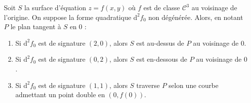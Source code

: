 
  \begin{application}
    Soit $S$ la surface d'équation $z = f(x, y)$ où $f$ est de classe $\mathcal{C}^3$ au voisinage de l'origine. On suppose la forme quadratique $\mathrm{d}^2 f_0$ non dégénérée. Alors, en notant $P$ le plan tangent à $S$ en $0$ :
    \begin{enumerate}[label={\bfseries(\roman*)}]
      \item Si $\mathrm{d}^2 f_0$ est de signature $(2, 0)$, alors $S$ est au-dessus de $P$ au voisinage de $0$.
      \item Si $\mathrm{d}^2 f_0$ est de signature $(0, 2)$, alors $S$ est en-dessous de $P$ au voisinage de $0$.
      \item Si $\mathrm{d}^2 f_0$ est de signature $(1, 1)$, alors $S$ traverse $P$ selon une courbe admettant un point double en $(0, f(0))$.
    \end{enumerate}
  \end{application}

